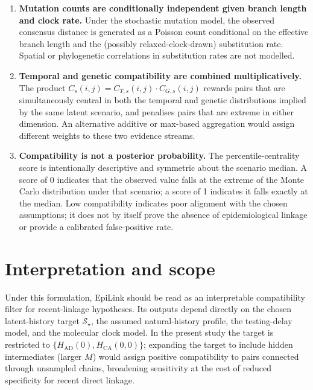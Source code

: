 \documentclass[11pt,a4paper]{article}
\begin{document}
\begin{enumerate}
\item \textbf{Mutation counts are conditionally independent given branch length and clock rate.}
Under the stochastic mutation model, the observed consensus distance is generated as a Poisson count conditional on the effective branch length and the (possibly relaxed-clock-drawn) substitution rate. Spatial or phylogenetic correlations in substitution rates are not modelled.

\item \textbf{Temporal and genetic compatibility are combined multiplicatively.}
The product $C_s(i,j) = C_{T,s}(i,j)\cdot C_{G,s}(i,j)$ rewards pairs that are simultaneously central in both the temporal and genetic distributions implied by the same latent scenario, and penalises pairs that are extreme in either dimension. An alternative additive or max-based aggregation would assign different weights to these two evidence streams.

\item \textbf{Compatibility is not a posterior probability.}
The percentile-centrality score is intentionally descriptive and symmetric about the scenario median. A score of 0 indicates that the observed value falls at the extreme of the Monte Carlo distribution under that scenario; a score of 1 indicates it falls exactly at the median. Low compatibility indicates poor alignment with the chosen assumptions; it does not by itself prove the absence of epidemiological linkage or provide a calibrated false-positive rate.

\end{enumerate}

\section{Interpretation and scope}
\label{sec:S1_interpretation}

Under this formulation, EpiLink should be read as an interpretable compatibility filter for recent-linkage hypotheses. Its outputs depend directly on the chosen latent-history target $\mathcal{S}_\star$, the assumed natural-history profile, the testing-delay model, and the molecular clock model. In the present study the target is restricted to $\{H_{\mathrm{AD}}(0), H_{\mathrm{CA}}(0,0)\}$; expanding the target to include hidden intermediates (larger $M$) would assign positive compatibility to pairs connected through unsampled chains, broadening sensitivity at the cost of reduced specificity for recent direct linkage.
\end{document}
